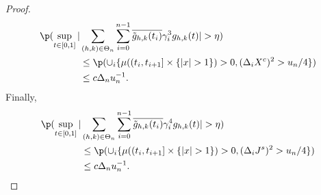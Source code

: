 \begin{proof}
\begin{align}
\p( \sup_{t \in \domain}\vert &\sumt \sumin \btghki \gamma^3_i  \ghk(t)\vert > \eta) \notag \\
&\le \p(    \cup_i\{ \mu( (t_i, t_{i+1}] \times \{\vert x \vert > 1 \} ) > 0,  (\dxc)^2 > u_n/4\}) \notag \\ & \le c \Delta_n u_n^{-1}. \label{eq:g3}\end{align}
Finally,
\begin{align}
\p( \sup_{t \in \domain}\vert &\sumt \sumin \btghki \gamma^4_i  \ghk(t)\vert > \eta) \notag \\
&\le \p(    \cup_i\{ \mu( (t_i, t_{i+1}] \times \{\vert x \vert > 1 \} ) > 0,  (\djt)^2 > u_n/4\}) \notag \\ & \le c \Delta_n u_n^{-1}.\label{eq:g4}\end{align}
\begin{comment}


\end{comment}
\end{proof}
